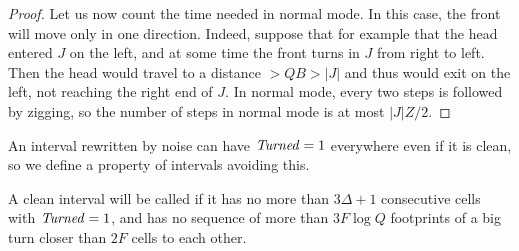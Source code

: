 \documentclass[11pt]{memoir}
\theoremstyle{definition} %
\newcommand{\fld}[1]{\ensuremath{\textit{#1\/}}}
\def\B{B}
\newcommand{\F}{F}
\newcommand{\Q}{Q} %
\newcommand{\Z}{Z} %
\newcommand{\Turned}{\fld{Turned}} %
\begin{document}
\begin{proof}
  Let us now count the time needed in normal mode.
  In this case, the front will move only in one direction.
  Indeed, suppose that for example that the head entered \( J \)
  on the left, and at some time the  front turns in \( J \) from right to left.
  Then the head would travel to a distance \( >\Q\B>|J| \) and thus would exit on the left,
  not reaching the right end of \( J \).
  In normal mode, every two steps is followed by zigging, so the number of steps in normal mode
  is at most \( |J|\Z/2 \).
\end{proof}

An interval rewritten by noise can have \( \Turned=1 \) everywhere even if it is clean, so we define
a property of intervals avoiding this.

\begin{definition}\label{def:safe-for-turns}
  A clean interval will be called  if it has no more than \( 3\Delta + 1 \) consecutive cells
  with \( \Turned=1 \), and has no sequence of more than \( 3\F\log\Q \)
  footprints of a big turn closer than \( 2\F \) cells to each other.
\end{definition}
\end{document}
